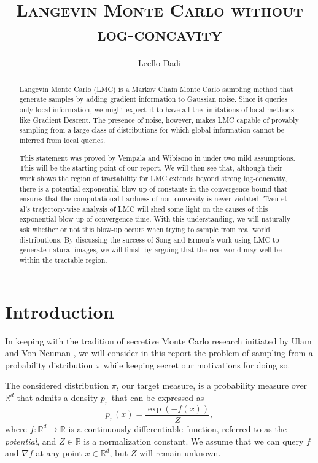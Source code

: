 \documentclass[11pt,twoside]{article}
\title{\textsc{Langevin Monte Carlo without log-concavity}}
\author{Leello Dadi}
\date{}
\theoremstyle{definition}
\newcommand{\R}{\mathbb{R}}
\begin{document}
\maketitle

\begin{abstract}
    Langevin Monte Carlo (LMC) is a Markov Chain Monte Carlo sampling method that generate samples by adding gradient information to Gaussian noise. Since it queries only local information, we might expect it to have all the limitations of local methods like Gradient Descent. The presence of noise, however, makes LMC capable of provably sampling from a large class of distributions for which global information cannot be inferred from local queries. 
    
    This statement was proved by Vempala and Wibisono in \cite{vempala_rapid_2019} under two mild assumptions. This will be the starting point of our report. We will then see that, although their work shows the region of tractability for LMC extends beyond strong log-concavity, there is a potential exponential blow-up of constants in the convergence bound that ensures that the computational hardness of non-convexity is never violated. Tzen et al's trajectory-wise analysis of LMC \cite{tzen_local_2018} will shed some light on the causes of this exponential blow-up of convergence time. With this understanding, we will naturally ask whether or not this blow-up occurs when trying to sample from real world distributions. By discussing the success of Song and Ermon's work \cite{song_generative_2019} using LMC to generate natural images, we will finish by arguing that the real world may well be within the tractable region.
\end{abstract}

\section{Introduction}

In keeping with the tradition of secretive Monte Carlo research initiated by Ulam and Von Neuman \cite{eckhardt_stan_nodate}, we will consider in this report the problem of sampling from a probability distribution $\pi$ while keeping secret our motivations for doing so. 

The considered distribution $\pi$, our target measure, is a probability measure over $\R^d$ that admits a density $p_\pi$ that can be expressed as
\[
p_\pi(x) = \frac{\exp{\left(-f(x)\right)}}{Z},
\]
where $f: \R^d \mapsto \R$ is a continuously differentiable function, referred to as the \textit{potential}, and $Z \in \R$ is a normalization constant. We assume that we can query $f$ and $\nabla f$ at any point $x \in \R^d$, but $Z$ will remain unknown.
\end{document}
